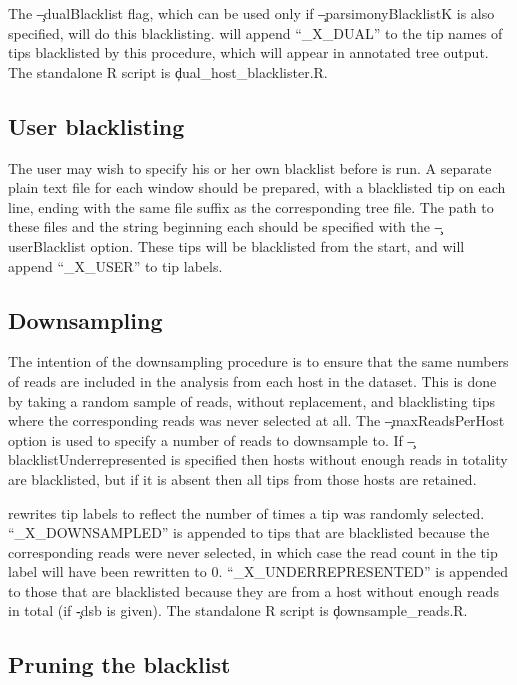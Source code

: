 The \c{--dualBlacklist} flag, which can be used only if \c{--parsimonyBlacklistK} is also specified, will do this blacklisting.
\pat will append ``\_X\_DUAL'' to the tip names of tips blacklisted by this procedure, which will appear in annotated tree output.
 The standalone R script is \c{dual\_host\_blacklister.R}.

\subsection{User blacklisting} \label{sec:UserBlacklisting}

The user may wish to specify his or her own blacklist before \pat is run.
A separate plain text file for each window should be prepared, with a blacklisted tip on each line, ending with the same file suffix as the corresponding tree file. The path to these files and the string beginning each should be specified with the \c{--userBlacklist} option.
These tips will be blacklisted from the start, and \pat will append ``\_X\_USER'' to tip labels.

\subsection{Downsampling}

The intention of the downsampling procedure is to ensure that the same numbers of reads are included in the analysis from each host in the dataset.
This is done by taking a random sample of reads, without replacement, and blacklisting tips where the corresponding reads was never selected at all.
 The \c{--maxReadsPerHost} option is used to specify a number of reads to downsample to.
If \c{--blacklistUnderrepresented} is specified then hosts without enough reads in totality are blacklisted, but if it is absent then all tips from those hosts are retained.

\pat rewrites tip labels to reflect the number of times a tip was randomly selected.
``\_X\_DOWNSAMPLED'' is appended to tips that are blacklisted because the corresponding reads were never selected, in which case the read count in the tip label will have been rewritten to 0.
``\_X\_UNDERREPRESENTED'' is appended to those that are blacklisted because they are from a host without enough reads in total (if \c{-dsb} is given).
The standalone R script is \c{downsample\_reads.R}.

\subsection{Pruning the blacklist}

